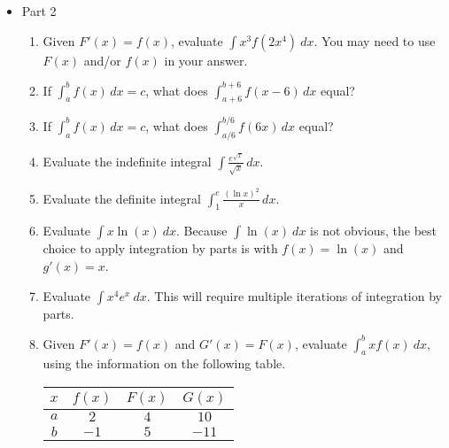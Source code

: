 \documentclass{article}
\begin{document}
\begin{itemize}
\begin{enumerate}
\end{enumerate}
            \item Part 2
                \begin{enumerate}
                    \item Given $F'(x)=f(x)$, evaluate $\displaystyle \int x^3f(2x^4)\ dx$. You may need to use $F(x)$ and/or $f(x)$ in your answer.
                    \item If $\displaystyle \int_a^b f(x)\,dx = c$, what does 
                    $\displaystyle \int_{a+6}^{b+6} f(x-6)\,dx$ equal?
                    \item If $\displaystyle \int_a^b f(x)\,dx = c$, what does 
                    $\displaystyle \int_{a/6}^{b/6} f(6x)\,dx$ equal?
                    \item Evaluate the indefinite integral 
                    $\displaystyle \int \frac{e^{\sqrt{x}}}{\sqrt{x}}\,dx$.
                    
                    \item Evaluate the definite integral 
                    $\displaystyle \int_{1}^{e} \frac{(\ln{x})^2}{x}\,dx$.
                    \item Evaluate $\displaystyle \int x\ln(x)\ dx$.  Because $\int \ln(x)\ dx$ is not obvious, the best choice to apply integration by parts is with $f(x)=\ln(x)$ and $g'(x)=x$.
                    \item Evaluate $\displaystyle \int x^4e^x\ dx$.  This will require multiple iterations of integration by parts.
                    \item Given $F'(x)=f(x)$ and $G'(x)=F(x)$, evaluate $\displaystyle \int_a^b xf(x)\ dx$, using the information on the following table. \\
                        \begin{center}
                        \begin{tabular}{|c|c|c|c|}
                        \hline
                        $x$ & $f(x)$ & $F(x)$ & $G(x)$ \\
                        \hline
                        $a$ & $2$ & $4$ & $10$ \\
                        \hline
                        $b$ & $-1$ & $5$ & $-11$ \\
                        \hline 
                        \end{tabular}
                        \end{center}
                        \medskip
                        

\end{enumerate}
\end{itemize}
\end{document}

